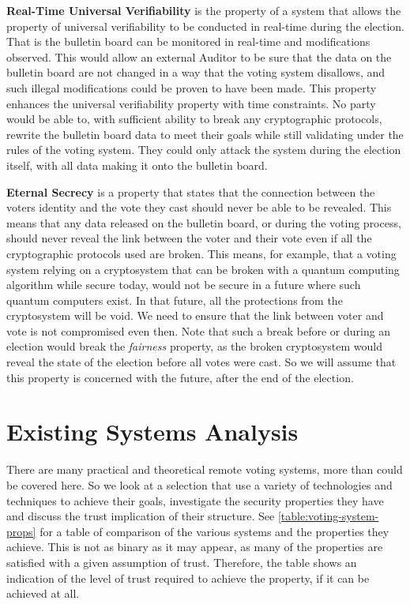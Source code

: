 \textbf{Real-Time Universal Verifiability} is the property of a system that allows the property of universal verifiability to be conducted in real-time during the election. That is the bulletin board can be monitored in real-time and modifications observed. This would allow an external Auditor to be sure that the data on the bulletin board are not changed in a way that the voting system disallows, and such illegal modifications could be proven to have been made. This property enhances the universal verifiability property with time constraints. No party would be able to, with sufficient ability to break any cryptographic protocols, rewrite the bulletin board data to meet their goals while still validating under the rules of the voting system. They could only attack the system during the election itself, with all data making it onto the bulletin board.

\textbf{Eternal Secrecy} is a property that states that the connection between the voters identity and the vote they cast should never be able to be revealed. This means that any data released on the bulletin board, or during the voting process, should never reveal the link between the voter and their vote even if all the cryptographic protocols used are broken. This means, for example, that a voting system relying on a cryptosystem that can be broken with a quantum computing algorithm while secure today, would not be secure in a future where such quantum computers exist. In that future, all the protections from the cryptosystem will be void. We need to ensure that the link between voter and vote is not compromised even then. Note that such a break before or during an election would break the \emph{fairness} property, as the broken cryptosystem would reveal the state of the election before all votes were cast. So we will assume that this property is concerned with the future, after the end of the election.


\section{Existing Systems Analysis}
\label{ch:ev:existing}

There are many practical and theoretical remote voting systems, more than could be covered here. So we look at a selection that use a variety of technologies and techniques to achieve their goals, investigate the security properties they have and discuss the trust implication of their structure. See \autoref{table:voting-system-props} for a table of comparison of the various systems and the properties they achieve. This is not as binary as it may appear, as many of the properties are satisfied with a given assumption of trust. Therefore, the table shows an indication of the level of trust required to achieve the property, if it can be achieved at all.

